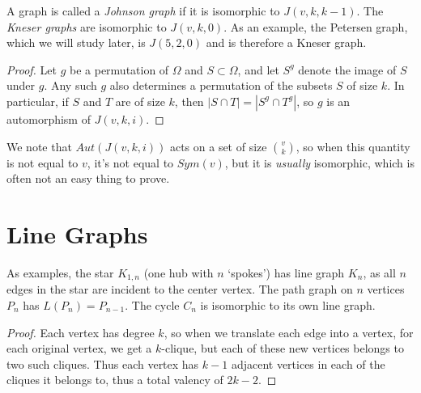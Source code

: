 A graph is called a \textit{Johnson graph} if it is isomorphic to $J(v,k,k-1)$.  The \textit{Kneser graphs} are isomorphic to $J(v,k,0)$.  As an example, the Petersen graph, which we will study later, is $J(5,2,0)$ and is therefore a Kneser graph.


\begin{proof}
	Let $g$ be a permutation of $\Omega$ and $S\subset \Omega$, and let $S^g$ denote the image of $S$ under $g$.  Any such $g$ also determines a permutation of the subsets $S$ of size $k$.  In particular, if $S$ and $T$ are of size $k$, then $|S\cap T|=|S^g\cap T^g|$, so $g$ is an automorphism of $J(v,k,i)$.
\end{proof}

We note that $Aut(J(v,k,i))$ acts on a set of size $\binom{v}{k}$, so when this quantity is not equal to $v$, it's not equal to $Sym(v)$, but it is \textit{usually} isomorphic, which is often not an easy thing to prove.


\section*{Line Graphs}


As examples, the star $K_{1,n}$ (one hub with $n$ `spokes') has line graph $K_n$, as all $n$ edges in the star are incident to the center vertex.  The path graph on $n$ vertices $P_n$ has $L(P_n)=P_{n-1}$.  The cycle $C_n$ is isomorphic to its own line graph.


\begin{proof}
	Each vertex has degree $k$, so when we translate each edge into a vertex, for each original vertex, we get a $k$-clique, but each of these new vertices belongs to two such cliques.  Thus each vertex has $k-1$ adjacent vertices in each of the cliques it belongs to, thus a total valency of $2k-2$.
\end{proof}



